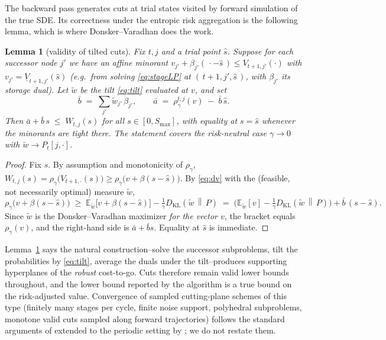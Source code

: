 \documentclass[pdflatex,sn-mathphys-num]{sn-jnl}
\theoremstyle{thmstyleone}
\newtheorem{lemma}[theorem]{Lemma}
\theoremstyle{thmstyletwo}
\theoremstyle{thmstylethree}
\newcommand{\E}{\mathbb{E}}
\newcommand{\KL}[2]{D_{\mathrm{KL}}\!\left(#1 \,\middle\|\, #2\right)}
\begin{document}
The backward pass generates cuts at trial states visited by forward
simulation of the true SDE. Its correctness under the entropic risk
aggregation is the following lemma, which is where
Donsker--Varadhan does the work.

\begin{lemma}[validity of tilted cuts]\label{lem:cut}
Fix $t,j$ and a trial point $\hat s$. Suppose for each successor node
$j'$ we have an affine minorant
$v_{j'} + \beta_{j'}(\,\cdot - \hat s\,) \le V_{t+1,j'}(\cdot)$
with $v_{j'} = \underline V_{t+1,j'}(\hat s)$ (e.g.\ from solving
\eqref{eq:stageLP} at $(\,t{+}1,j',\hat s\,)$, with $\beta_{j'}$ its
storage dual). Let $\tilde w$ be the tilt \eqref{eq:tilt} evaluated at
$v$, and set
\[
\bar b \;=\; \sum_{j'} \tilde w_{j'}\, \beta_{j'},
\qquad
\bar a \;=\; \rho^{t,j}_\gamma(v) \;-\; \bar b\,\hat s .
\]
Then $\bar a + \bar b\, s \;\le\; W_{t,j}(s)$ for all
$s \in [0,S_{\max}]$, with equality at $s = \hat s$ whenever the
minorants are tight there. The statement covers the risk-neutral case
$\gamma \to 0$ with $\tilde w \to P_t[j,\cdot]$.
\end{lemma}

\begin{proof}
Fix $s$. By assumption and monotonicity of $\rho_\gamma$,
$W_{t,j}(s) = \rho_\gamma\big(V_{t+1,\cdot}(s)\big)
\ge \rho_\gamma\big(v + \beta(s-\hat s)\big)$.
By \eqref{eq:dv} with the (feasible, not necessarily optimal) measure
$\tilde w$,
\[
\rho_\gamma\big(v + \beta(s-\hat s)\big)
\;\ge\;
\E_{\tilde w}\big[v + \beta(s-\hat s)\big] - \tfrac1\gamma\KL{\tilde w}{P}
\;=\;
\Big(\E_{\tilde w}[v] - \tfrac1\gamma\KL{\tilde w}{P}\Big)
+ \bar b\,(s-\hat s).
\]
Since $\tilde w$ is the Donsker--Varadhan maximizer \emph{for the vector
$v$}, the bracket equals $\rho_\gamma(v)$, and the right-hand side is
$\bar a + \bar b s$. Equality at $\hat s$ is immediate.
\end{proof}

Lemma~\ref{lem:cut} says the natural construction--solve the successor
subproblems, tilt the probabilities by \eqref{eq:tilt}, average the
duals under the tilt--produces supporting hyperplanes of the
\emph{robust} cost-to-go. Cuts therefore remain valid lower bounds
throughout, and the lower bound reported by the algorithm is a true
bound on the risk-adjusted value. Convergence of sampled cutting-plane
schemes of this type (finitely many stages per cycle, finite noise
support, polyhedral subproblems, monotone valid cuts sampled along
forward trajectories) follows the standard arguments of
\citet{philpott2008,girardeau2015} extended to the periodic setting by
\citet{shapiro2020}; we do not restate them.
\end{document}
